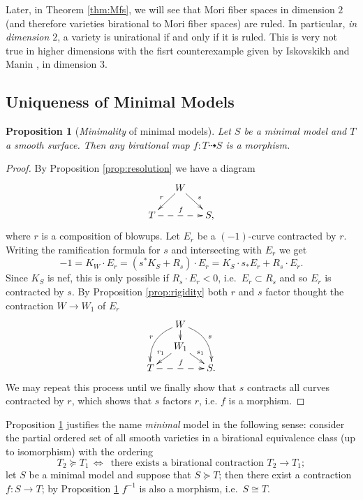 \documentclass[a4paper,11pt]{amsart}
\newtheorem{proposition}[theorem]{Proposition}
\newcommand{\isom}{\cong}
\newcommand{\rmap}{\dashrightarrow}
\begin{document}
Later, in Theorem \ref{thm:Mfs}, we will see that Mori fiber spaces in dimension $2$ (and therefore varieties birational to Mori fiber spaces) are ruled.
In particular, \emph{in dimension $2$}, a variety is unirational if and only if it is ruled.
This is very not true in higher dimensions with the fisrt counterexample given by Iskovskikh and Manin \cite{Luroth}, in dimension $3$.

\subsection{Uniqueness of Minimal Models}

\begin{proposition}[{\emph{Minimality} of minimal models}]\label{prop:minimality}
	Let $S$ be a minimal model and $T$ a smooth surface.
	Then any birational map $f\colon T \rmap S$ is a morphism.
\end{proposition}

\begin{proof}
	By Proposition \ref{prop:resolution} we have a diagram
	\[
	\xymatrix@R=.5cm@C=.5cm{
		& W \ar[ld]_r \ar[rd]^s\\
		T \ar@{-->}[rr]^f && S,
	}
	\]
	where $r$ is a composition of blowups.
	Let $E_r$ be a $(-1)$-curve contracted by $r$.
	Writing the ramification formula for $s$ and intersecting with $E_r$ we get
	\[
	-1 = K_W\cdot E_r = \left(s^*K_S + R_s\right)\cdot E_r = K_S\cdot s_*E_r + R_s\cdot E_r.
	\]
	Since $K_S$ is nef, this is only possible if $R_s\cdot E_r < 0$, i.e.\ $E_r \subset R_s$ and so $E_r$ is contracted by $s$.
	By Proposition \ref{prop:rigidity} both $r$ and $s$ factor thought the contraction $W \to W_1$ of $E_r$
	\[
	\xymatrix@R=.3cm@C=.5cm{
	&W \ar[d] \ar@/_1pc/[ldd]_r \ar@/^1pc/[rdd]^s\\
	&W_1 \ar[ld]_{r_1} \ar[rd]^{s_1}\\
	T \ar@{-->}[rr]^f && S.
	}
	\]
	We may repeat this process until we finally show that $s$ contracts all curves contracted by $r$, which shows that $s$ factors $r$, i.e. $f$ is a morphism. 
\end{proof}

Proposition \ref{prop:minimality} justifies the name \emph{minimal} model in the following sense:
consider the partial ordered set of all smooth varieties in a birational equivalence class (up to isomorphism) with the ordering
\[
	T_2 \succeq T_1 \, \iff \, \text{ there exists a birational contraction } T_2 \to T_1; 
\]
let $S$ be a minimal model and suppose that $S \succeq T$;
then there exist a contraction $f\colon S \to T$;
by Proposition \ref{prop:minimality} $f^{-1}$ is also a morphism, i.e.\ $S \isom T$.
\end{document}
